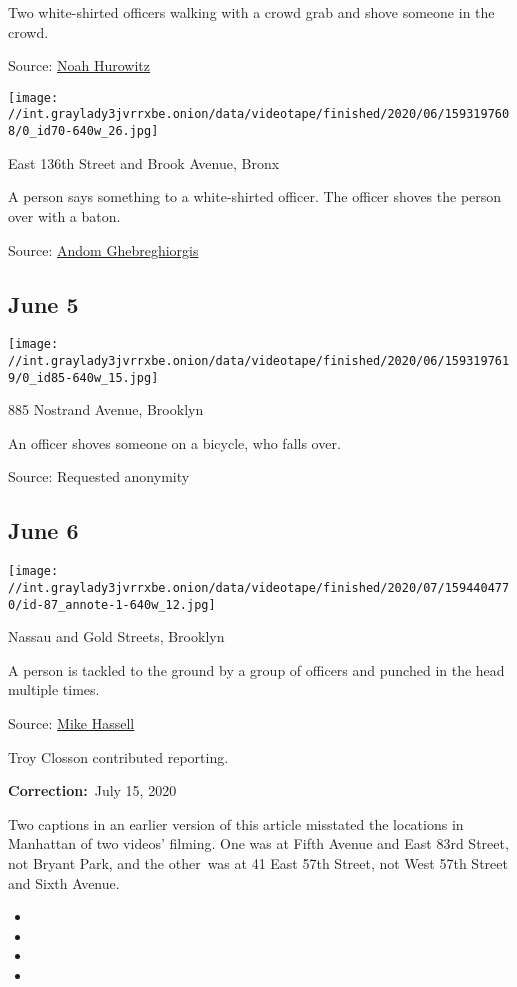 Two white-shirted officers walking with a crowd grab and shove someone
in the crowd.

Source:
\href{https://twitter.com/NoahHurowitz/status/1268726877679738886}{Noah
Hurowitz}

\texttt{[image: //int.graylady3jvrrxbe.onion/data/videotape/finished/2020/06/1593197608/0\_id70-640w\_26.jpg]}

 East 136th Street and Brook Avenue, Bronx

 A person says something to a white-shirted officer. The officer shoves
the person over with a baton.

Source:
\href{https://twitter.com/AndomForNY/status/1269065999048941569}{Andom
Ghebreghiorgis}

\hypertarget{june-5}{%
\subsection{June 5}\label{june-5}}

\texttt{[image: //int.graylady3jvrrxbe.onion/data/videotape/finished/2020/06/1593197619/0\_id85-640w\_15.jpg]}

 885 Nostrand Avenue, Brooklyn

 An officer shoves someone on a bicycle, who falls over.

Source: Requested anonymity

\hypertarget{june-6}{%
\subsection{June 6}\label{june-6}}

\texttt{[image: //int.graylady3jvrrxbe.onion/data/videotape/finished/2020/07/1594404770/id-87\_annote-1-640w\_12.jpg]}

 Nassau and Gold Streets, Brooklyn

 A person is tackled to the ground by a group of officers and punched in
the head multiple times.

Source: \href{https://vimeo.com/426847270}{Mike Hassell}

Troy Closson contributed reporting.

\textbf{Correction:}~July 15, 2020

Two captions in an earlier version of this article misstated the
locations in Manhattan of two videos' filming. One was at Fifth Avenue
and East 83rd Street, not Bryant Park, and the other~was at 41 East 57th
Street, not West 57th Street and Sixth Avenue.

\begin{itemize}
\item
\item
\item
\item
\end{itemize}

